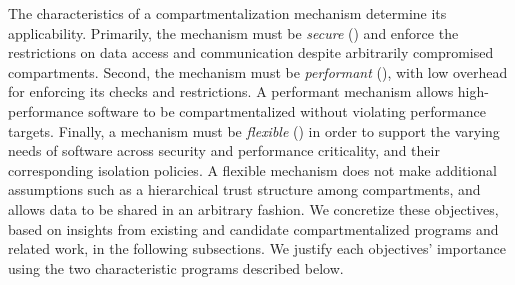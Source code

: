The characteristics of a compartmentalization mechanism 
determine its applicability.
Primarily, the mechanism must be \emph{secure} () 
and enforce the
restrictions on data access and communication despite arbitrarily compromised
compartments. 
Second, the mechanism must be \emph{performant} (), 
with low overhead for enforcing its checks and restrictions.
A performant mechanism allows high-performance software
to be compartmentalized without violating performance targets.
Finally, a mechanism must be \emph{flexible} () in order to 
support the varying needs of software across security and 
performance criticality, and their corresponding isolation policies.
A flexible mechanism does not make additional assumptions such as
a hierarchical trust structure among compartments, and allows
data to be shared in an arbitrary fashion.
We concretize these objectives, based on insights from existing
and candidate compartmentalized programs and related work, 
in the following subsections.
We justify each objectives' importance using the
two characteristic programs described below.


